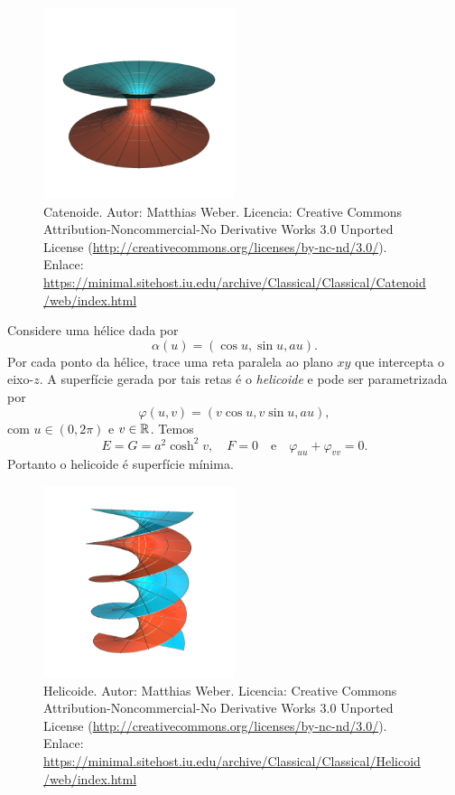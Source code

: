 \begin{figure}
	\centering
	\includegraphics[width=0.5\textwidth]{images/catenoid}
	\caption{Catenoide. Autor: Matthias Weber. Licencia: Creative Commons Attribution-Noncommercial-No Derivative Works 3.0 Unported License (\url{http://creativecommons.org/licenses/by-nc-nd/3.0/}). Enlace: \url{https://minimal.sitehost.iu.edu/archive/Classical/Classical/Catenoid/web/index.html}}
\end{figure}

\begin{exemplo}
	Considere uma hélice dada por
	\begin{equation*}
	\alpha(u) = \left( \cos u, \sin u, au \right).
	\end{equation*}
	Por cada ponto da hélice, trace uma reta paralela ao plano $xy$ que intercepta o eixo-$z$.
	A superfície gerada por tais retas é o \emph{helicoide} e pode ser parametrizada por
	\begin{equation*}
	\varphi(u,v) = \left( v \cos u, v \sin u, au \right),
	\end{equation*}
	com $u \in (0, 2 \pi)$ e $v \in \mathbb{R}$. Temos
	\begin{equation*}
	E = G = a^2 \cosh^2 v, \quad F = 0 \quad \text{e} \quad \varphi_{uu} + \varphi_{vv} = 0.
	\end{equation*}
	Portanto o helicoide é superfície mínima.
\end{exemplo}

\begin{figure}
	\centering
	\includegraphics[width=0.5\textwidth]{images/helicoid}
	\caption{Helicoide. Autor: Matthias Weber. Licencia: Creative Commons Attribution-Noncommercial-No Derivative Works 3.0 Unported License (\url{http://creativecommons.org/licenses/by-nc-nd/3.0/}). Enlace: \url{https://minimal.sitehost.iu.edu/archive/Classical/Classical/Helicoid/web/index.html}}
\end{figure}

